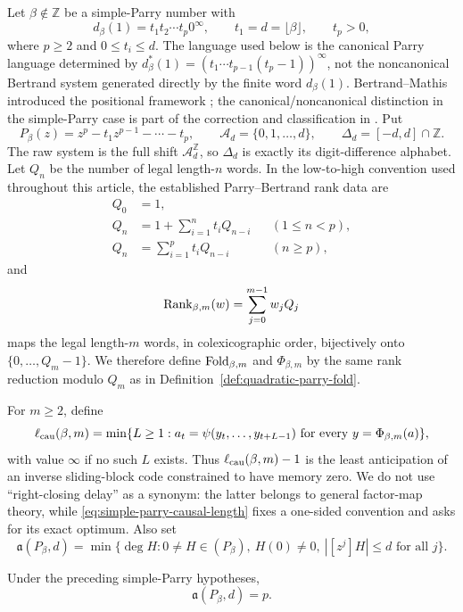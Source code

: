 Let $\beta\notin\mathbb Z$ be a simple-Parry number with
\[
d_\beta(1)=t_1t_2\cdots t_p0^\infty,
\qquad t_1=d=\lfloor\beta\rfloor,
\qquad t_p>0,
\]
where $p\ge2$ and $0\le t_i\le d$.  The language used below is the canonical
Parry language determined by
$d_\beta^*(1)=(t_1\cdots t_{p-1}(t_p-1))^\infty$, not the noncanonical
Bertrand system generated directly by the finite word $d_\beta(1)$.
Bertrand--Mathis introduced the positional framework
\cite{BertrandMathis1989}; the canonical/noncanonical distinction in the
simple-Parry case is part of the correction and classification in
\cite{CharlierCisterninoStipulanti2022}.  Put
\[
P_\beta(z)=z^p-t_1z^{p-1}-\cdots-t_p,
\qquad
\mathcal A_d=\{0,1,\ldots,d\},
\qquad
\Delta_d=[-d,d]\cap\mathbb Z.
\]
The raw system is the full shift $\mathcal A_d^{\mathbb Z}$, so $\Delta_d$
is exactly its digit-difference alphabet.  Let $Q_n$ be the number of legal
length-$n$ words.  In the low-to-high convention used throughout this
article, the established Parry--Bertrand rank data are
\begin{align}
Q_0&=1,\nonumber\\
Q_n&=1+\sum_{i=1}^n t_iQ_{n-i} &&(1\le n<p),\label{eq:simple-parry-Q}\\
Q_n&=\sum_{i=1}^p t_iQ_{n-i} &&(n\ge p),\nonumber
\end{align}
and
\[
\operatorname{Rank}_{\beta,m}(w)=\sum_{j=0}^{m-1}w_jQ_j
\]
maps the legal length-$m$ words, in colexicographic order, bijectively onto
$\{0,\ldots,Q_m-1\}$.  We therefore define $\mathrm{Fold}_{\beta,m}$ and
$\Phi_{\beta,m}$ by the same rank reduction modulo $Q_m$ as in
Definition~\ref{def:quadratic-parry-fold}.

For $m\ge2$, define
\begin{equation}
\ell_{\rm cau}(\beta,m)
=\min\{L\ge1:a_t=\psi(y_t,\ldots,y_{t+L-1})
\text{ for every }y=\Phi_{\beta,m}(a)\},
\label{eq:simple-parry-causal-length}
\end{equation}
with value $\infty$ if no such $L$ exists.  Thus
$\ell_{\rm cau}(\beta,m)-1$ is the least anticipation of an inverse
sliding-block code constrained to have memory zero.  We do not use
``right-closing delay'' as a synonym: the latter belongs to general
factor-map theory, while \eqref{eq:simple-parry-causal-length} fixes a
one-sided convention and asks for its exact optimum.  Also set
\[
\mathfrak a(P_\beta,d)
=\min\{\deg H:0\ne H\in(P_\beta),\ H(0)\ne0,
\ |[z^j]H|\le d\text{ for all }j\}.
\]

\begin{proposition}
\label{prop:simple-parry-bounded-order}
Under the preceding simple-Parry hypotheses,
\[
\mathfrak a(P_\beta,d)=p.
\]
\end{proposition}

